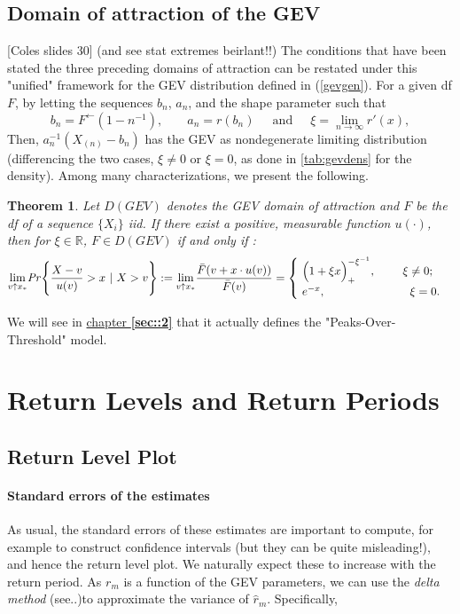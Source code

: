 \documentclass[11pt,a4paper,openany ]{book}
\newtheorem{theorem}{Theorem}[chapter]
\begin{document}
\subsection{Domain of attraction of the GEV}
[Coles slides 30] (and see stat extremes beirlant!!) The conditions that have been stated the three preceding domains of attraction can be restated under this "unified" framework for the GEV distribution defined in (\ref{gevgen}).
For a given df $F$, by letting the sequences $b_n$, $a_n$, and the shape parameter such that
\begin{equation*}
b_n=F^{\leftarrow}(1-n^{-1})\text{, } \ \ \ \ \ \ \ \ a_n=r(b_n) \ \ \ \ \ \text{ and } \ \ \ \ \ \xi=\displaystyle{\lim_{n \to \infty}}r'(x),
\end{equation*}
 Then, $a_n^{-1}(X_{(n)}-b_n)$ has the GEV as nondegenerate limiting distribution (differencing the two cases, $\xi\neq 0$ or $\xi=0$, as done in \ref{tab:gevdens} for the density).
 Among many characterizations, we present the following. 
\begin{theorem}
	Let $D(GEV)$ denotes the GEV domain of attraction and $F$ be the df of a sequence $\{X_i\}$ iid. If there exist a positive, measurable function $u(\cdot)$, then for $\xi\in\mathbb{R}$, $F\in D(GEV)$ if and only if :
	\begin{equation}
	\displaystyle{\lim_{v \uparrow x_*}} \text{\emph{Pr}} \Bigg\{\frac{X-v}{u(v)}>x \ | \ X>v\Bigg\}:=\displaystyle{\lim_{v \uparrow x_*}}\frac{\bar{F}(v+x\cdot u(v))}{\bar{F}(v)}=\begin{cases}
	\ \Big(1+\xi x\Big)_+^{-\xi^{-1}}, \ \ \ \ \ \ \ \xi\neq 0;    \\
	\  e^{-x}, \ \ \ \ \ \ \ \ \ \ \ \ \ \ \ \ \qquad \xi=0.
	\end{cases}
	\end{equation}
\end{theorem}
We will see in \hyperref[sec::2]{chapter \textbf{\ref{sec::2}}} 
that it actually defines the "Peaks-Over-Threshold" model.


\section{Return Levels and Return Periods}\label{rlgev}

\subsection{Return Level Plot}\label{rlplot}
\paragraph*{Standard errors of the estimates}As usual, the standard errors of these estimates are important to compute, for example to construct confidence intervals (but they can be quite misleading!), and hence the return level plot. We naturally expect these to increase with the return period.
As $r_m$ is a function of the GEV parameters, we can use the \emph{delta method} (see..)to approximate the variance of $\hat{r}_m$. Specifically,
\end{document}
